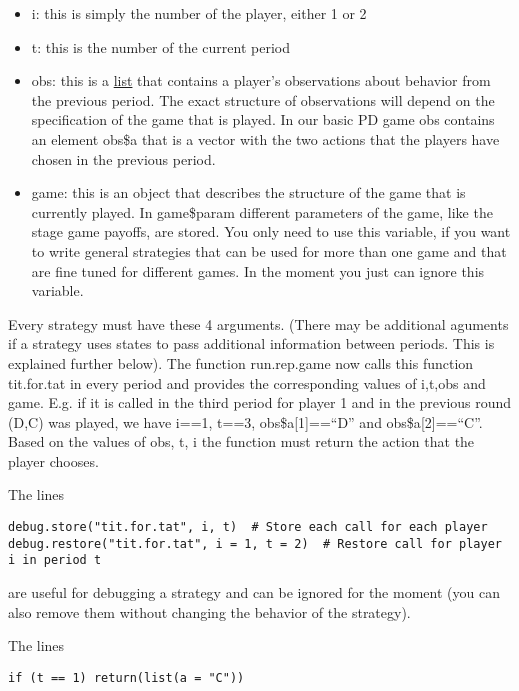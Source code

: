 \documentclass[]{article}
\begin{document}
\begin{itemize}
\itemsep1pt\parskip0pt
\item
  i: this is simply the number of the player, either 1 or 2
\item
  t: this is the number of the current period
\item
  obs: this is a
  \href{http://cran.r-project.org/doc/manuals/R-intro.html\#Lists}{list}
  that contains a player's observations about behavior from the previous
  period. The exact structure of observations will depend on the
  specification of the game that is played. In our basic PD game obs
  contains an element obs\$a that is a vector with the two actions that
  the players have chosen in the previous period.
\item
  game: this is an object that describes the structure of the game that
  is currently played. In game\$param different parameters of the game,
  like the stage game payoffs, are stored. You only need to use this
  variable, if you want to write general strategies that can be used for
  more than one game and that are fine tuned for different games. In the
  moment you just can ignore this variable.
\end{itemize}

Every strategy must have these 4 arguments. (There may be additional
aguments if a strategy uses states to pass additional information
between periods. This is explained further below). The function
run.rep.game now calls this function tit.for.tat in every period and
provides the corresponding values of i,t,obs and game. E.g. if it is
called in the third period for player 1 and in the previous round (D,C)
was played, we have i==1, t==3, obs\$a{[}1{]}==``D'' and
obs\$a{[}2{]}==``C''. Based on the values of obs, t, i the function must
return the action that the player chooses.

The lines

\begin{verbatim}
debug.store("tit.for.tat", i, t)  # Store each call for each player
debug.restore("tit.for.tat", i = 1, t = 2)  # Restore call for player i in period t
\end{verbatim}

are useful for debugging a strategy and can be ignored for the moment
(you can also remove them without changing the behavior of the
strategy).

The lines

\begin{verbatim}
if (t == 1) return(list(a = "C"))
\end{verbatim}
\end{document}
